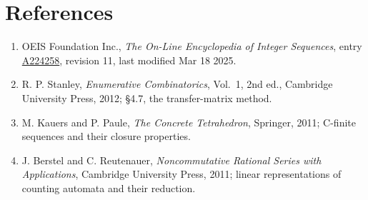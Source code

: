 \documentclass[11pt]{article}
\theoremstyle{definition}
\begin{document}
\section{References}

\begin{enumerate}

\item OEIS Foundation Inc., \emph{The On-Line Encyclopedia of Integer Sequences}, entry \href{https://oeis.org/A224258}{A224258}, revision 11, last modified Mar 18 2025.

\item R. P. Stanley, \emph{Enumerative Combinatorics}, Vol.~1, 2nd ed., Cambridge University Press, 2012; \S4.7, the transfer-matrix method.

\item M. Kauers and P. Paule, \emph{The Concrete Tetrahedron}, Springer, 2011; C-finite sequences and their closure properties.

\item J. Berstel and C. Reutenauer, \emph{Noncommutative Rational Series with Applications}, Cambridge University Press, 2011; linear representations of counting automata and their reduction.

\end{enumerate}
\end{document}
